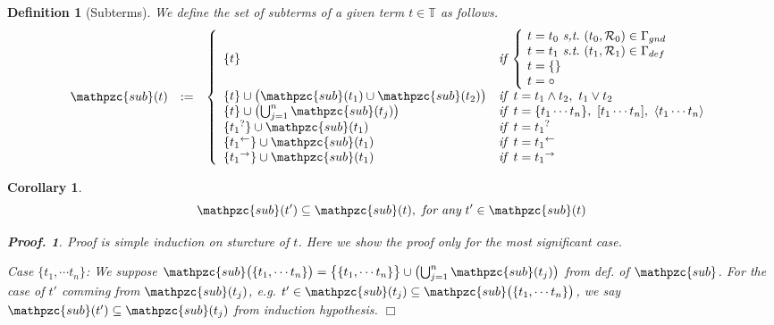 \documentclass[12pt]{article}
\newtheorem{Definition}{Definition}[section]
\newtheorem{Corollary}{Corollary}[section]
\newtheorem{Proof}{Proof.}
\begin{document}
\begin{Definition}[Subterms]
  We define the set of subterms of a given term $t \in \mathbb{T}$ as
  follows.
  \begin{displaymath}
    \begin{array}{lll}
      \mathpzc{sub}(t) &:=
      & \left\{ \begin{array}{ll}
          \{t \}  &
           \text{\it if}\;
            \left\{ \! \begin{array}{l}
              t = t_0\ \text{\it s,t.}\
               (t_0, \mathcal{R}_0) \in \Gamma_{gnd}  \\
              t = t_1\ \text{\it s.t.}\
               (t_1, \mathcal{R}_1) \in \Gamma_{def}  \\
              t = \{\}  \\
              t = \circ
            \end{array} \right.  \\
          \{t \} \cup \bigl(\mathpzc{sub}(t_1) \cup \mathpzc{sub}(t_2)
           \bigr)  &
           \text{\it if}\;\; t = t_1 \wedge t_2,\ t_1 \vee t_2  \\
          \{t \} \cup \bigl(\bigcup^{n}_{j=1} \mathpzc{sub}(t_j) \bigr)  &
           \text{\it if}\;\; t = \{t_1 \cdots t_n \},
            \ [t_1 \cdots t_n ], \ \langle t_1 \cdots t_n \rangle  \\
          \{{t_1}^? \} \cup \mathpzc{sub}(t_1)  &
           \text{\it if}\;\; t = {t_1}^?  \\
          \{{t_1}^\leftarrow \} \cup \mathpzc{sub}(t_1)  &
           \text{\it if}\;\; t = {t_1}^\leftarrow \\
          \{{t_1}^\rightarrow \} \cup \mathpzc{sub}(t_1)  &
           \text{\it if}\;\; t = {t_1}^\rightarrow
        \end{array} \right.
    \end{array}
  \end{displaymath}
\end{Definition}


\begin{Corollary}
  \label{self_similarity_on_subterms}
  \[ \mathpzc{sub}(t') \subseteq \mathpzc{sub}(t),\ \text{\it for any}\
      t' \in \mathpzc{sub}(t)
  \]
  \begin{Proof}
    Proof is simple induction on sturcture of $t$.
    Here we show the proof only for the most significant case.
    
    Case $\{t_1, \cdots t_n\}$:
    We suppose $\mathpzc{sub}\bigl(\{t_1, \cdots t_n\} \bigr) =
    \bigl\{\{t_1, \cdots t_n\} \bigr\} \cup
    \bigl(\bigcup_{j=1}^n \mathpzc{sub}(t_j) \bigr)$ from def. of
    $\mathpzc{sub}$. For the case of $t'$ comming from
    $\mathpzc{sub}(t_j)$, e.g. $t' \in \mathpzc{sub}(t_j) \subseteq
    \mathpzc{sub}\bigl(\{t_1, \cdots t_n\} \bigr)$, we say
    $\mathpzc{sub}(t') \subseteq \mathpzc{sub}(t_j)$ from
    induction hypothesis.
    $\Box$
  \end{Proof}
\end{Corollary}
\end{document}
